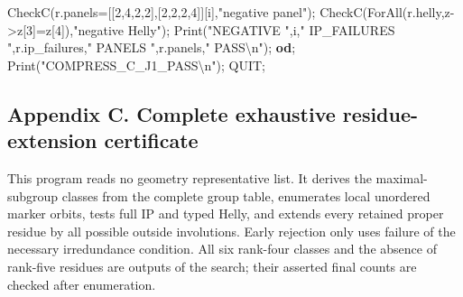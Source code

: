 \documentclass[
  10pt,
  letterpaper,
]{article}
\newenvironment{Shaded}{}{}
\newcommand{\BuiltInTok}[1]{\textcolor[rgb]{0.00,0.50,0.00}{#1}}
\newcommand{\ControlFlowTok}[1]{\textcolor[rgb]{0.00,0.44,0.13}{\textbf{#1}}}
\newcommand{\FloatTok}[1]{\textcolor[rgb]{0.25,0.63,0.44}{#1}}
\newcommand{\NormalTok}[1]{#1}
\newcommand{\OperatorTok}[1]{\textcolor[rgb]{0.40,0.40,0.40}{#1}}
\newcommand{\StringTok}[1]{\textcolor[rgb]{0.25,0.44,0.63}{#1}}
\newcommand{\VariableTok}[1]{\textcolor[rgb]{0.10,0.09,0.49}{#1}}
\begin{document}
\begin{Shaded}
\begin{Highlighting}[]
 \VariableTok{CheckC}\NormalTok{(}\VariableTok{r}\NormalTok{.}\VariableTok{panels}\OperatorTok{=}\NormalTok{[[}\FloatTok{2}\OperatorTok{,}\FloatTok{4}\OperatorTok{,}\FloatTok{2}\OperatorTok{,}\FloatTok{2}\NormalTok{]}\OperatorTok{,}\NormalTok{[}\FloatTok{2}\OperatorTok{,}\FloatTok{2}\OperatorTok{,}\FloatTok{2}\OperatorTok{,}\FloatTok{4}\NormalTok{]][}\VariableTok{i}\NormalTok{]}\OperatorTok{,}\StringTok{"negative panel"}\NormalTok{)}\OperatorTok{;}
 \VariableTok{CheckC}\NormalTok{(}\BuiltInTok{ForAll}\NormalTok{(}\VariableTok{r}\NormalTok{.}\VariableTok{helly}\OperatorTok{,}\VariableTok{z}\OperatorTok{{-}\textgreater{}}\VariableTok{z}\NormalTok{[}\FloatTok{3}\NormalTok{]}\OperatorTok{=}\VariableTok{z}\NormalTok{[}\FloatTok{4}\NormalTok{])}\OperatorTok{,}\StringTok{"negative Helly"}\NormalTok{)}\OperatorTok{;}
 \BuiltInTok{Print}\NormalTok{(}\StringTok{"NEGATIVE "}\OperatorTok{,}\VariableTok{i}\OperatorTok{,}\StringTok{" IP\_FAILURES "}\OperatorTok{,}\VariableTok{r}\NormalTok{.}\VariableTok{ip\_failures}\OperatorTok{,}\StringTok{" PANELS "}\OperatorTok{,}\VariableTok{r}\NormalTok{.}\VariableTok{panels}\OperatorTok{,}\StringTok{" PASS\textbackslash{}n"}\NormalTok{)}\OperatorTok{;}
\ControlFlowTok{od}\OperatorTok{;}
\BuiltInTok{Print}\NormalTok{(}\StringTok{"COMPRESS\_C\_J1\_PASS\textbackslash{}n"}\NormalTok{)}\OperatorTok{;}
\VariableTok{QUIT}\OperatorTok{;}
\end{Highlighting}
\end{Shaded}

\subsection{Appendix C. Complete exhaustive residue-extension
certificate}\label{appendix-c.-complete-exhaustive-residue-extension-certificate}

This program reads no geometry representative list. It derives the
maximal-subgroup classes from the complete group table, enumerates local
unordered marker orbits, tests full IP and typed Helly, and extends
every retained proper residue by all possible outside involutions. Early
rejection only uses failure of the necessary irredundance condition. All
six rank-four classes and the absence of rank-five residues are outputs
of the search; their asserted final counts are checked after
enumeration.
\end{document}
